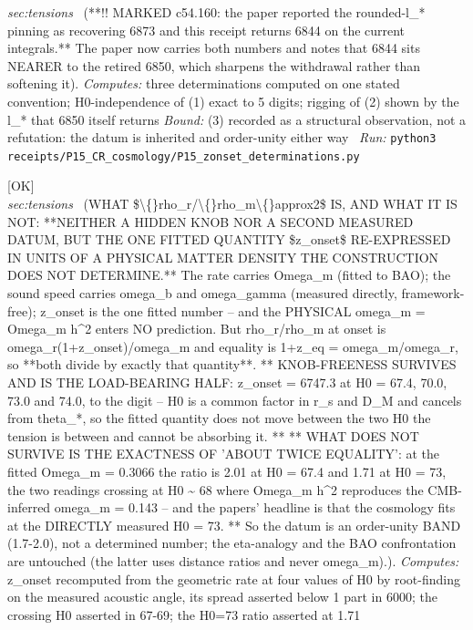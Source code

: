 \begin{description}
\textit{sec:tensions} \ (**!! MARKED c54.160: the paper reported the rounded-l\_* pinning as recovering 6873 and this receipt returns 6844 on the current integrals.** The paper now carries both numbers and notes that 6844 sits NEARER to the retired 6850, which sharpens the withdrawal rather than softening it). 
\emph{Computes:} three determinations computed on one stated convention; H0-independence of (1) exact to 5 digits; rigging of (2) shown by the l\_* that 6850 itself returns
 \emph{Bound:} (3) recorded as a structural observation, not a refutation: the datum is inherited and order-unity either way
\ \emph{Run:} \texttt{python3 receipts/P15\_CR\_cosmology/P15\_zonset\_determinations.py}
\item[\rcptlabel{P15_the_ratio_is_the_onset_in_imported_units}{P15R25}\textbf{P15R25}\quad\texttt{P15\_the\_ratio\_is\_the\_onset\_in\_imported\_units}]\hfill\textsf{[OK]}\\
\textit{sec:tensions} \ (WHAT \$\textbackslash\{\}rho\_r/\textbackslash\{\}rho\_m\textbackslash\{\}approx2\$ IS, AND WHAT IT IS NOT: **NEITHER A HIDDEN KNOB NOR A SECOND MEASURED DATUM, BUT THE ONE FITTED QUANTITY \$z\_onset\$ RE-EXPRESSED IN UNITS OF A PHYSICAL MATTER DENSITY THE CONSTRUCTION DOES NOT DETERMINE.** The rate carries Omega\_m (fitted to BAO); the sound speed carries omega\_b and omega\_gamma (measured directly, framework-free); z\_onset is the one fitted number -- and the PHYSICAL omega\_m = Omega\_m h\textasciicircum{}2 enters NO prediction. But rho\_r/rho\_m at onset is omega\_r(1+z\_onset)/omega\_m and equality is 1+z\_eq = omega\_m/omega\_r, so **both divide by exactly that quantity**. ** KNOB-FREENESS SURVIVES AND IS THE LOAD-BEARING HALF: z\_onset = 6747.3 at H0 = 67.4, 70.0, 73.0 and 74.0, to the digit -- H0 is a common factor in r\_s and D\_M and cancels from theta\_*, so the fitted quantity does not move between the two H0 the tension is between and cannot be absorbing it. ** ** WHAT DOES NOT SURVIVE IS THE EXACTNESS OF 'ABOUT TWICE EQUALITY': at the fitted Omega\_m = 0.3066 the ratio is 2.01 at H0 = 67.4 and 1.71 at H0 = 73, the two readings crossing at H0 \textasciitilde{} 68 where Omega\_m h\textasciicircum{}2 reproduces the CMB-inferred omega\_m = 0.143 -- and the papers' headline is that the cosmology fits at the DIRECTLY measured H0 = 73. ** So the datum is an order-unity BAND (1.7-2.0), not a determined number; the eta-analogy and the BAO confrontation are untouched (the latter uses distance ratios and never omega\_m).). 
\emph{Computes:} z\_onset recomputed from the geometric rate at four values of H0 by root-finding on the measured acoustic angle, its spread asserted below 1 part in 6000; the crossing H0 asserted in 67-69; the H0=73 ratio asserted at 1.71

\end{description}
